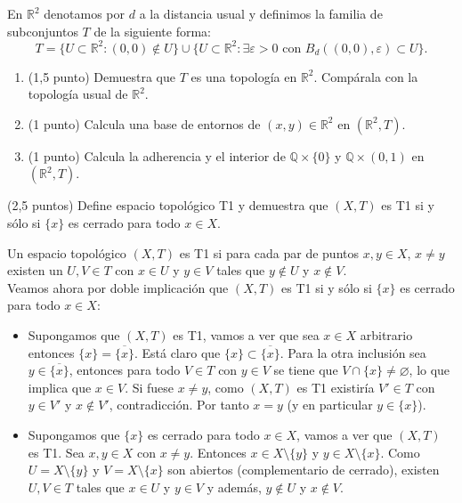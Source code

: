 \documentclass[12pt]{article}
\begin{document}
    \begin{ejercicio}
    En $\mathbb{R}^2$ denotamos por $d$ a la distancia usual y definimos la familia de subconjuntos $T$ de la siguiente forma:
    \[
        T = \{U \subset \mathbb{R}^2 : (0,0) \notin U\} \cup \{U \subset \mathbb{R}^2 : \exists \varepsilon > 0 \text{ con } B_d((0,0), \varepsilon) \subset U\}.
    \]
    \begin{enumerate}
        \item (1,5 punto) Demuestra que $T$ es una topología en $\mathbb{R}^2$. Compárala con la topología usual de $\mathbb{R}^2$.
        \item (1 punto) Calcula una base de entornos de $(x,y) \in \mathbb{R}^2$ en $(\mathbb{R}^2, T)$.
        \item (1 punto) Calcula la adherencia y el interior de $\mathbb{Q} \times \{0\}$ y $\mathbb{Q} \times (0,1)$ en $(\mathbb{R}^2, T)$.
    \end{enumerate}
    \end{ejercicio}

    \newpage
    \setcounter{ejercicio}{0} %
    \noindent

    \begin{ejercicio} 
    (2,5 puntos) Define espacio topológico T1 y demuestra que $(X, T)$ es T1 si y sólo si $\{x\}$ es cerrado para todo $x \in X$.
    
    Un espacio topológico $(X, T)$ es T1 si para cada par de puntos $x, y\in X$, $x\neq y$ existen un $U, V\in T$ con $x\in U$ y $y\in V$ tales que $y\notin U$ y $x\notin V$.\\

    Veamos ahora por doble implicación que $(X, T)$ es T1 si y sólo si $\{x\}$ es cerrado para todo $x \in X$:
    \begin{itemize}
        \item[$\Rightarrow$] Supongamos que $(X, T)$ es T1, vamos a ver que sea $x\in X$ arbitrario entonces $\{x\} = \overline{\{x\}}$. Está claro que $\{x\} \subset \overline{\{x\}}$. Para la otra inclusión sea $y \in \overline{\{x\}}$, entonces para todo $V\in T$ con $y\in V$ se tiene que $V\cap \{x\} \neq \varnothing$, lo que implica que $x\in V$. Si fuese $x \neq y$, como $(X, T)$ es T1 existiría $V' \in T$ con $y \in V'$ y $x \notin V'$, contradicción. Por tanto $x = y$ (y en particular $y \in \{x\}$).
        \item[$\Leftarrow$] Supongamos que $\{x\}$ es cerrado para todo $x \in X$, vamos a ver que $(X, T)$ es T1. Sea $x, y \in X$ con $x \neq y$. Entonces $x \in X \setminus \{y\}$ y $y \in X \setminus \{x\}$. Como $U = X \setminus \{y\}$ y $V =X \setminus \{x\}$ son abiertos (complementario de cerrado), existen $U, V \in T$ tales que $x \in U$ y $y \in V$ y además, $y \notin U$ y $x \notin V$.
    \end{itemize} 
    \end{ejercicio}
\end{document}
